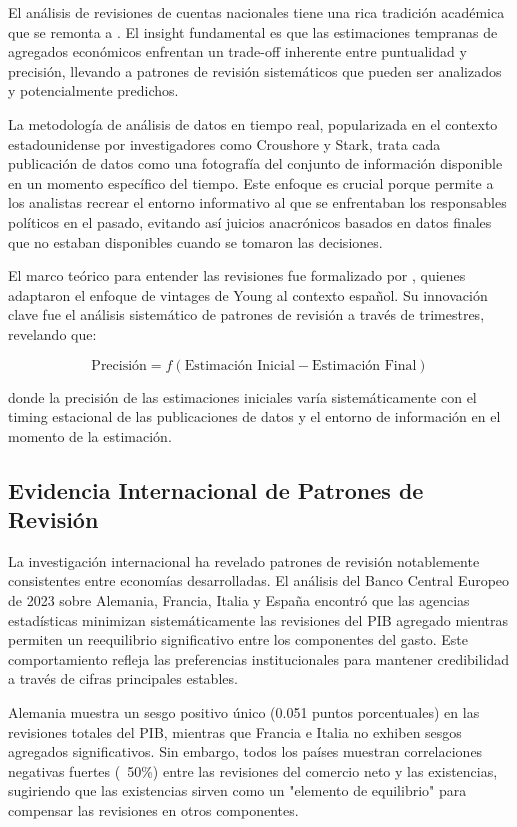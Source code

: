 \documentclass[12pt,a4paper]{article}
\begin{document}
El análisis de revisiones de cuentas nacionales tiene una rica tradición académica que se remonta a \citet{young1993}. El insight fundamental es que las estimaciones tempranas de agregados económicos enfrentan un trade-off inherente entre puntualidad y precisión, llevando a patrones de revisión sistemáticos que pueden ser analizados y potencialmente predichos.

La metodología de análisis de datos en tiempo real, popularizada en el contexto estadounidense por investigadores como Croushore y Stark, trata cada publicación de datos como una fotografía del conjunto de información disponible en un momento específico del tiempo. Este enfoque es crucial porque permite a los analistas recrear el entorno informativo al que se enfrentaban los responsables políticos en el pasado, evitando así juicios anacrónicos basados en datos finales que no estaban disponibles cuando se tomaron las decisiones.

El marco teórico para entender las revisiones fue formalizado por \citet{pavia2017}, quienes adaptaron el enfoque de vintages de Young al contexto español. Su innovación clave fue el análisis sistemático de patrones de revisión a través de trimestres, revelando que:

\begin{equation}
\text{Precisión} = f(\text{Estimación Inicial} - \text{Estimación Final})
\end{equation}

donde la precisión de las estimaciones iniciales varía sistemáticamente con el timing estacional de las publicaciones de datos y el entorno de información en el momento de la estimación.

\subsection{Evidencia Internacional de Patrones de Revisión}

La investigación internacional ha revelado patrones de revisión notablemente consistentes entre economías desarrolladas. El análisis del Banco Central Europeo de 2023 sobre Alemania, Francia, Italia y España encontró que las agencias estadísticas minimizan sistemáticamente las revisiones del PIB agregado mientras permiten un reequilibrio significativo entre los componentes del gasto. Este comportamiento refleja las preferencias institucionales para mantener credibilidad a través de cifras principales estables.

Alemania muestra un sesgo positivo único (0.051 puntos porcentuales) en las revisiones totales del PIB, mientras que Francia e Italia no exhiben sesgos agregados significativos. Sin embargo, todos los países muestran correlaciones negativas fuertes (~50\%) entre las revisiones del comercio neto y las existencias, sugiriendo que las existencias sirven como un "elemento de equilibrio" para compensar las revisiones en otros componentes.
\end{document}
